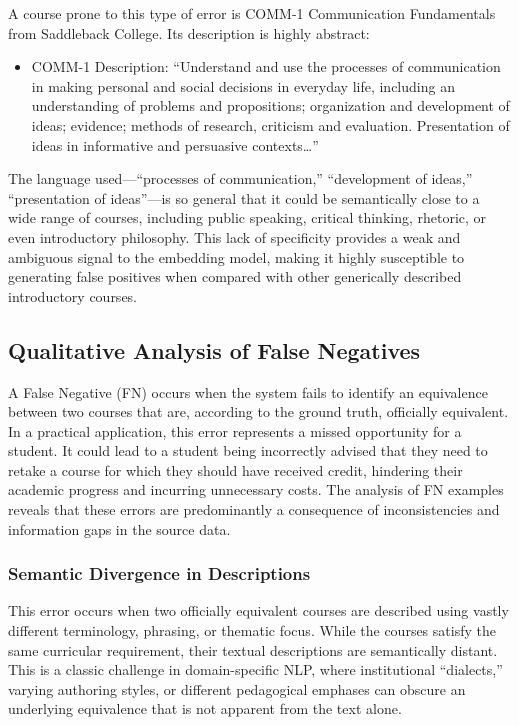A course prone to this type of error is COMM-1 Communication Fundamentals from Saddleback College. Its description is highly abstract:
\begin{itemize}
    \item COMM-1 Description: ``Understand and use the processes of communication in making personal and social decisions in everyday life, including an understanding of problems and propositions; organization and development of ideas; evidence; methods of research, criticism and evaluation. Presentation of ideas in informative and persuasive contexts\dots''
\end{itemize}

The language used---``processes of communication,'' ``development of ideas,'' ``presentation of ideas''---is so general that it could be semantically close to a wide range of courses, including public speaking, critical thinking, rhetoric, or even introductory philosophy. This lack of specificity provides a weak and ambiguous signal to the embedding model, making it highly susceptible to generating false positives when compared with other generically described introductory courses.

\subsection{Qualitative Analysis of False Negatives}
A False Negative (FN) occurs when the system fails to identify an equivalence between two courses that are, according to the ground truth, officially equivalent. In a practical application, this error represents a missed opportunity for a student. It could lead to a student being incorrectly advised that they need to retake a course for which they should have received credit, hindering their academic progress and incurring unnecessary costs. The analysis of FN examples reveals that these errors are predominantly a consequence of inconsistencies and information gaps in the source data.

\subsubsection{Semantic Divergence in Descriptions}
This error occurs when two officially equivalent courses are described using vastly different terminology, phrasing, or thematic focus. While the courses satisfy the same curricular requirement, their textual descriptions are semantically distant. This is a classic challenge in domain-specific NLP, where institutional ``dialects,'' varying authoring styles, or different pedagogical emphases can obscure an underlying equivalence that is not apparent from the text alone.

